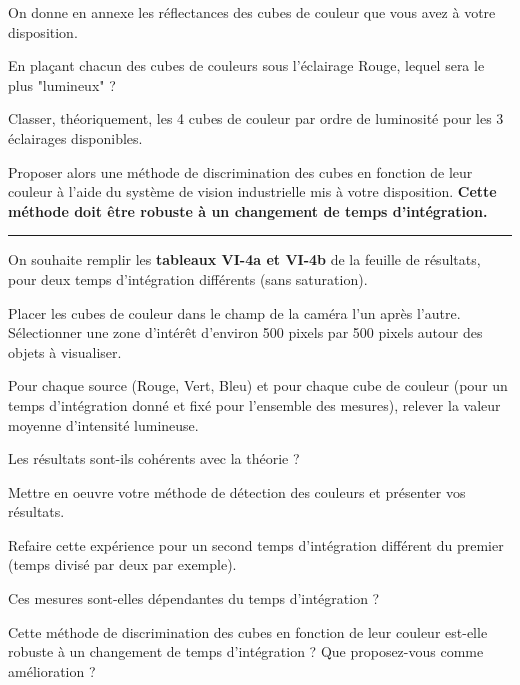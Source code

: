 \medskip

On donne en annexe les réflectances des cubes de couleur que vous avez à votre disposition.

\medskip

\Quest En plaçant chacun des cubes de couleurs sous l'éclairage Rouge, lequel sera le plus "lumineux" ? 

\Quest Classer, théoriquement, les 4 cubes de couleur par ordre de luminosité pour les 3 éclairages disponibles.

\Quest Proposer alors une méthode de discrimination des cubes en fonction de leur couleur à l'aide du système de vision industrielle mis à votre disposition. \textbf{Cette méthode doit être robuste à un changement de temps d'intégration.}


\noindent \rule{\linewidth}{1pt}

On souhaite remplir les \textbf{tableaux VI-4a et VI-4b} de la feuille de résultats, pour deux temps d'intégration différents (sans saturation).

\Manip Placer les cubes de couleur dans le champ de la caméra l'un après l'autre. Sélectionner une zone d'intérêt d'environ 500 pixels par 500 pixels autour des objets à visualiser. 

\Manip Pour chaque source (Rouge, Vert, Bleu) et pour chaque cube de couleur (pour un temps d'intégration donné et fixé pour l'ensemble des mesures), relever la valeur moyenne d'intensité lumineuse. 

\Quest Les résultats sont-ils cohérents avec la théorie ?

\Manip Mettre en oeuvre votre méthode de détection des couleurs et présenter vos résultats.

\Manip Refaire cette expérience pour un second temps d'intégration différent du premier (temps divisé par deux par exemple).

\Quest Ces mesures sont-elles dépendantes du temps d'intégration ?

\Quest Cette méthode de discrimination des cubes en fonction de leur couleur est-elle robuste à un changement de temps d'intégration ? Que proposez-vous comme amélioration ?


